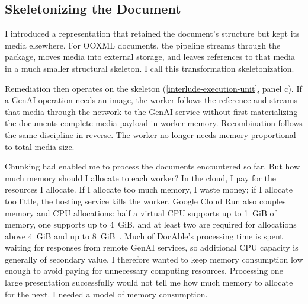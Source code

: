 
\subsection{Skeletonizing the Document}\label{heading:remove-media-from-the-working-set}

I introduced a representation that retained the document's structure but kept its media elsewhere. For OOXML documents, the pipeline streams through the package, moves media into external storage, and leaves references to that media in a much smaller structural skeleton. I call this transformation skeletonization.

Remediation then operates on the skeleton (\autoref{interlude-execution-unit}, panel c). If a GenAI operation needs an image, the worker follows the reference and streams that media through the network to the GenAI service without first materializing the document\textquotesingle s complete media payload in worker memory. Recombination follows the same discipline in reverse. The worker no longer needs memory proportional to total media size.


Chunking had enabled me to process the documents encountered so far. But how much memory should I allocate to each worker? In the cloud, I pay for the resources I allocate. If I allocate too much memory, I waste money; if I allocate too little, the hosting service kills the worker. Google Cloud Run also couples memory and CPU allocations: half a virtual CPU supports up to 1~GiB of memory, one supports up to 4~GiB, and at least two are required for allocations above 4~GiB and up to 8~GiB~\citep{google2026cloudruncpu}. Much of DocAble’s processing time is spent waiting for responses from remote GenAI services, so additional CPU capacity is generally of secondary value. I therefore wanted to keep memory consumption low enough to avoid paying for unnecessary computing resources. Processing one large presentation successfully would not tell me how much memory to allocate for the next. I needed a model of memory consumption.

